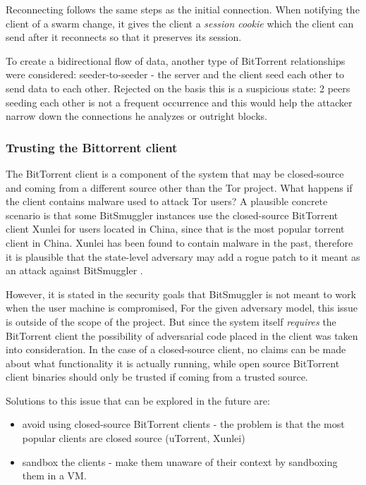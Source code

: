 \documentclass[11pt]{book} %
\newcommand{\projectName}{BitSmuggler }
\begin{document}
Reconnecting follows the same steps as the initial connection. When notifying the client of a swarm change, it gives the client a \textit{session cookie} which the client can send after it reconnects so that it preserves its session.

To create a bidirectional flow of data, another type of BitTorrent relationships were considered: seeder-to-seeder - the server and the client seed each other to send data to each other. Rejected on the basis this is a suspicious state: 2 peers seeding each other is not a frequent occurrence and this would help the attacker narrow down the connections he analyzes or outright blocks.


\subsubsection{Trusting the Bittorrent client}
\label{subsubsec:trustingBitTorrentClient}


The BitTorrent client is a component of the system that may be closed-source and coming from a different source other than the Tor project. What happens if the client contains malware used to attack Tor users? A plausible concrete scenario is that some \projectName instances use the closed-source BitTorrent client Xunlei for users located in China, since that is the most popular torrent client in China. Xunlei has been found to contain malware in the past, therefore it is plausible that the state-level adversary may add a rogue patch to it meant as an attack against \projectName.


However, it is stated in the security goals that \projectName is not meant to work when the user machine is compromised, For the given adversary model, this issue is outside of the scope of the project. But since the system itself \textit{requires} the BitTorrent client  the possibility of adversarial code placed in the client was taken into consideration. In the case of a closed-source client, no claims can be made about what functionality it is actually running, while open source BitTorrent client binaries should only be trusted if coming from a trusted source.

Solutions to this issue that can be explored in the future are:
\begin{itemize}
\item avoid using closed-source BitTorrent clients - the problem is that the most popular clients are closed source (uTorrent, Xunlei)
\item sandbox the clients - make them unaware of their context by sandboxing them in a VM.
\end{itemize}
\end{document}
